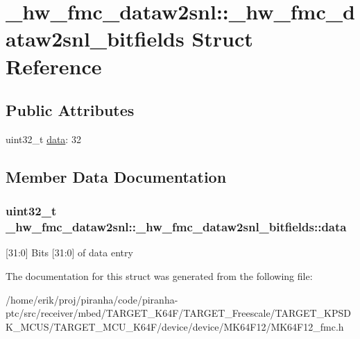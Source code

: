 \hypertarget{struct__hw__fmc__dataw2snl_1_1__hw__fmc__dataw2snl__bitfields}{}\section{\+\_\+hw\+\_\+fmc\+\_\+dataw2snl\+:\+:\+\_\+hw\+\_\+fmc\+\_\+dataw2snl\+\_\+bitfields Struct Reference}
\label{struct__hw__fmc__dataw2snl_1_1__hw__fmc__dataw2snl__bitfields}
\subsection*{Public Attributes}
\begin{DoxyCompactItemize}
\item 
uint32\+\_\+t \hyperlink{struct__hw__fmc__dataw2snl_1_1__hw__fmc__dataw2snl__bitfields_ad844363d19bec1a0b494dae0785e4cb0}{data}\+: 32
\end{DoxyCompactItemize}


\subsection{Member Data Documentation}
\subsubsection[{\texorpdfstring{data}{data}}]{\setlength{\rightskip}{0pt plus 5cm}uint32\+\_\+t \+\_\+hw\+\_\+fmc\+\_\+dataw2snl\+::\+\_\+hw\+\_\+fmc\+\_\+dataw2snl\+\_\+bitfields\+::data}\hypertarget{struct__hw__fmc__dataw2snl_1_1__hw__fmc__dataw2snl__bitfields_ad844363d19bec1a0b494dae0785e4cb0}{}\label{struct__hw__fmc__dataw2snl_1_1__hw__fmc__dataw2snl__bitfields_ad844363d19bec1a0b494dae0785e4cb0}
\mbox{[}31\+:0\mbox{]} Bits \mbox{[}31\+:0\mbox{]} of data entry 

The documentation for this struct was generated from the following file\+:\begin{DoxyCompactItemize}
\item 
/home/erik/proj/piranha/code/piranha-\/ptc/src/receiver/mbed/\+T\+A\+R\+G\+E\+T\+\_\+\+K64\+F/\+T\+A\+R\+G\+E\+T\+\_\+\+Freescale/\+T\+A\+R\+G\+E\+T\+\_\+\+K\+P\+S\+D\+K\+\_\+\+M\+C\+U\+S/\+T\+A\+R\+G\+E\+T\+\_\+\+M\+C\+U\+\_\+\+K64\+F/device/device/\+M\+K64\+F12/M\+K64\+F12\+\_\+fmc.\+h\end{DoxyCompactItemize}
